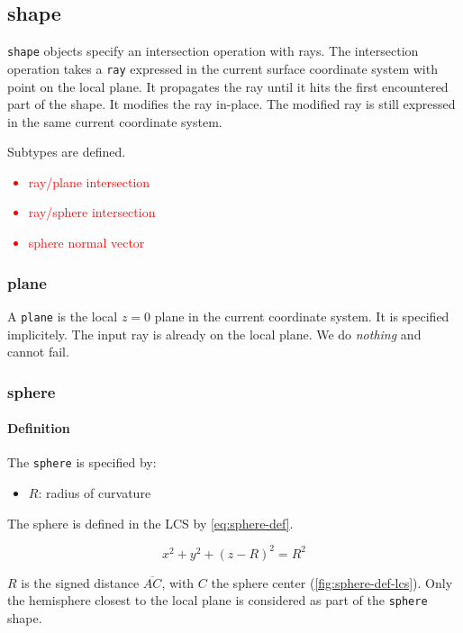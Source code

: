 \subsection{shape}
\lstinline{shape} objects specify an intersection operation with rays.
The intersection operation takes a \lstinline{ray} expressed in the current
surface coordinate system with point on the local plane. It propagates
the ray until it hits the first encountered part of the shape. It modifies
the ray in-place. The modified ray is still expressed in the same current
coordinate system.

Subtypes are defined.

\textcolor{red}{\begin{itemize}
\item ray/plane intersection
\item ray/sphere intersection
\item sphere normal vector
\end{itemize}}

\subsubsection{plane}
A \lstinline{plane} is the local $z=0$ plane in the current coordinate system.
It is specified implicitely.  The input ray is already on the local plane. We
do \emph{nothing} and cannot fail.

\subsubsection{sphere}

\paragraph{Definition}
The \lstinline{sphere} is specified by:

\begin{itemize}
\item $R$: radius of curvature
\end{itemize}

The sphere is defined in the \gls{LCS} by \cref{eq:sphere-def}.

\begin{equation} \label{eq:sphere-def}
x^2 + y^2 + (z - R)^2 = R^2
\end{equation}

$R$ is the signed distance $\overline{AC}$, with $C$ the sphere center
(\cref{fig:sphere-def-lcs}). Only the hemisphere closest to the local plane
is considered as part of the \lstinline{sphere} shape.

